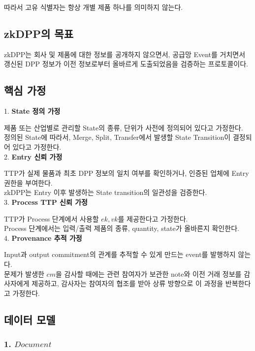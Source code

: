\documentclass[11pt,a4paper]{extarticle}
\begin{document}
따라서 고유 식별자는 항상 개별 제품 하나를 의미하지 않는다.

\subsection{zkDPP의 목표}

zkDPP는 회사 및 제품에 대한 정보를 공개하지 않으면서, 공급망 Event를 거치면서 갱신된 DPP 정보가
이전 정보로부터 올바르게 도출되었음을 검증하는 프로토콜이다.

\subsection{핵심 가정}

1. \textbf{State 정의 가정}

제품 또는 산업별로 관리할 State의 종류, 단위가 사전에 정의되어 있다고 가정한다. \\
정의된 State에 따라서, Merge, Split, Transfer에서 발생할 State Transition이 결정되어 있다고 가정한다. \\

2. \textbf{Entry 신뢰 가정}

TTP가 실제 물품과 최초 DPP 정보의 일치 여부를 확인하거나, 인증된 업체에 Entry 권한을 부여한다. \\
zkDPP는 Entry 이후 발생하는 State transition의 일관성을 검증한다. \\

3. \textbf{Process TTP 신뢰 가정}

TTP가 Process 단계에서 사용할 \(ek, vk\)를 제공한다고 가정한다. \\
Process 단계에서는 입력/출력 제품의 종류, quantity, state가 올바른지 확인한다.\\

4. \textbf{Provenance 추적 가정}

Input과 output commitment의 관계를 추적할 수 있게 만드는 event를 발행하지 않는다.\\

문제가 발생한 \(cm\)을 감사할 때에는 관련 참여자가 보관한 note와 이전 거래 정보를
감사자에게 제공하고, 감사자는 참여자의 협조를 받아 상류 방향으로 이 과정을 반복한다고
가정한다.

\subsection{데이터 모델}

\subsubsection*{1. \(Document\)}
\end{document}
